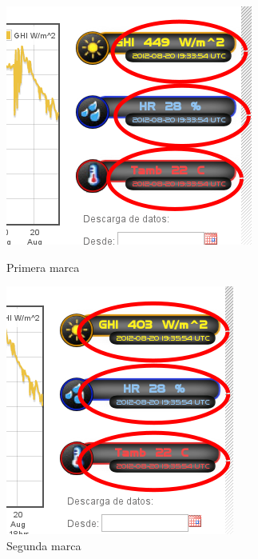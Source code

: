 \begin{figure}[h]
	\begin{minipage}[b]{0.45\linewidth}
		\centering
		\includegraphics[width=\textwidth]{./images/cap5chap1img5-1}
		\caption{Primera marca}
		\label{fig:figure1}
	\end{minipage}
	\begin{minipage}[b]{0.45\linewidth}
		\centering
                \includegraphics[width=\textwidth]{./images/cap5chap1img5-2}
                \caption{Segunda marca}
                \label{fig:figure1}
	\end{minipage}
\end{figure}
